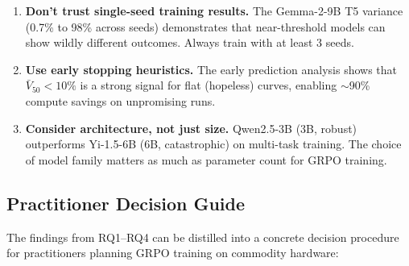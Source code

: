 \documentclass[11pt]{article}
\begin{document}
\begin{enumerate}[leftmargin=*]
\item \textbf{Don't trust single-seed training results.} The Gemma-2-9B T5 variance (0.7\% to 98\% across seeds) demonstrates that near-threshold models can show wildly different outcomes.  Always train with at least 3 seeds.

\item \textbf{Use early stopping heuristics.} The early prediction analysis shows that $\bar{V}_{50} < 10\%$ is a strong signal for flat (hopeless) curves, enabling $\sim$90\% compute savings on unpromising runs.

\item \textbf{Consider architecture, not just size.} Qwen2.5-3B (3B, robust) outperforms Yi-1.5-6B (6B, catastrophic) on multi-task training.  The choice of model family matters as much as parameter count for GRPO training.
\end{enumerate}

\subsection{Practitioner Decision Guide}

The findings from RQ1--RQ4 can be distilled into a concrete decision procedure for practitioners planning GRPO training on commodity hardware:
\end{document}
